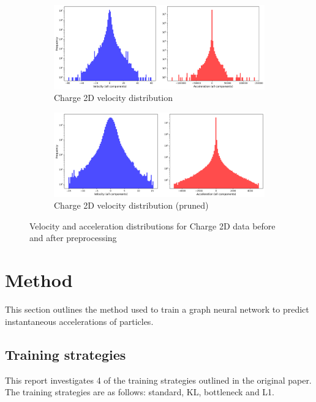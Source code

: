 \documentclass[11pt]{article}
\begin{document}
\begin{figure}[H]
    \centering
    \begin{subfigure}{0.9\textwidth}
        \includegraphics[width=\textwidth]{figs/charge_2_accel_vel_dist_unpruned.png}
        \caption{Charge 2D velocity distribution}
        \label{fig:charge_2_vel_dist_unpruned}
    \end{subfigure}
    \begin{subfigure}{0.9\textwidth}
        \includegraphics[width=\textwidth]{figs/charge_2_accel_vel_dist_pruned.png}
        \caption{Charge 2D velocity distribution (pruned)}
        \label{fig:charge_2_vel_dist_pruned}
    \end{subfigure}
    \caption{Velocity and acceleration distributions for Charge 2D data before and after preprocessing}
    \label{fig:distributions}
\end{figure}


\section{Method}
This section outlines the method used to train a graph neural network to predict instantaneous accelerations of particles.

\subsection{Training strategies}
This report investigates 4 of the training strategies outlined in the original paper. The training strategies are as follows: standard, KL, bottleneck and L1. 
\end{document}
